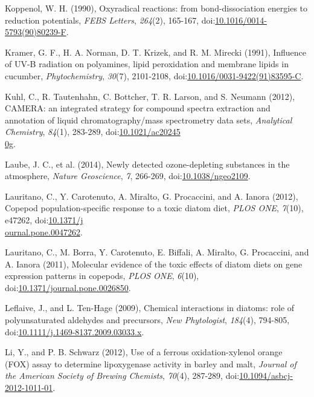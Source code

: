 \begin{singlespace}
{{Koppenol, W. H. (1990), Oxyradical reactions: from bond-dissociation energies to reduction potentials, \emph{FEBS Letters}, \emph{264}(2), 165-167, doi:\href{http://dx.doi.org/10.1016/0014-5793(90)80239-F}{10.1016/0014-5793(90)80239-F}.

Kramer, G. F., H. A. Norman, D. T. Krizek, and R. M. Mirecki (1991), Influence of UV-B radiation on polyamines, lipid peroxidation and membrane lipids in cucumber, \emph{Phytochemistry}, \emph{30}(7), 2101-2108, doi:\href{http://dx.doi.org/10.1016/0031-9422(91)83595-C}{10.1016/0031-9422(91)83595-C}.

Kuhl, C., R. Tautenhahn, C. Bottcher, T. R. Larson, and S. Neumann (2012), CAMERA: an integrated strategy for compound spectra extraction and annotation of liquid chromatography/mass spectrometry data sets, \emph{Analytical Chemistry}, \emph{84}(1), 283-289, doi:\href{http://dx.doi.org/10.1021/ac202450g}{10.1021/ac20245\\0g}.

Laube, J. C., et al. (2014), Newly detected ozone-depleting substances in the atmosphere, \emph{Nature Geoscience}, \emph{7}, 266-269, doi:\href{http://dx.doi.org/10.1038/ngeo2109}{10.1038/ngeo2109}.

Lauritano, C., Y. Carotenuto, A. Miralto, G. Procaccini, and A. Ianora (2012), Copepod population-specific response to a toxic diatom diet, \emph{PLOS ONE}, \emph{7}(10), e47262, doi:\href{http://dx.doi.org/10.1371/journal.pone.0047262}{10.1371/j\\ournal.pone.0047262}.

Lauritano, C., M. Borra, Y. Carotenuto, E. Biffali, A. Miralto, G. Procaccini, and A. Ianora (2011), Molecular evidence of the toxic effects of diatom diets on gene expression patterns in copepods, \emph{PLOS ONE}, \emph{6}(10), doi:\href{http://dx.doi.org/10.1371/journal.pone.0026850}{10.1371/journal.pone.0026850}.

Leflaive, J., and L. Ten-Hage (2009), Chemical interactions in diatoms: role of polyunsaturated aldehydes and precursors, \emph{New Phytologist}, \emph{184}(4), 794-805, doi:\href{http://dx.doi.org/10.1111/j.1469-8137.2009.03033.x}{10.1111/j.1469-8137.2009.03033.x}.

Li, Y., and P. B. Schwarz (2012), Use of a ferrous oxidation-xylenol orange (FOX) assay to determine lipoxygenase activity in barley and malt, \emph{Journal of the American Society of Brewing Chemists}, \emph{70}(4), 287-289, doi:\href{http://dx.doi.org/10.1094/asbcj-2012-1011-01}{10.1094/asbcj-2012-1011-01}.

}}
\end{singlespace}
